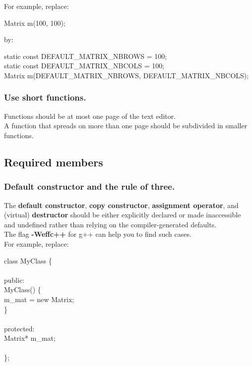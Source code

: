 For example, replace:
\begin{algorithm}[H]
Matrix m(100, 100);
\end{algorithm}

by:
\begin{algorithm}[H]
static const DEFAULT\_MATRIX\_NBROWS = 100; \\
static const DEFAULT\_MATRIX\_NBCOLS = 100; \\
Matrix m(DEFAULT\_MATRIX\_NBROWS, DEFAULT\_MATRIX\_NBCOLS);
\end{algorithm}

\subsubsection{Use short functions.}
Functions should be at most one page of the text editor.\\
A function that spreads on more than one page should be subdivided in
smaller functions.

\subsection{Required members}
\subsubsection{Default constructor and the rule of three.}
The {\bf default constructor}, {\bf copy constructor}, {\bf assignment
  operator}, and (virtual) {\bf destructor} should be either explicitly declared
or made inaccessible and undefined rather than relying on the
compiler-generated defaults.\\
The flag {\bf -Weffc++} for g++ can help you to find such cases.\\

For example, replace:
\begin{algorithm}[H]
class MyClass \{ \\
 \\
public: \\
MyClass() \{ \\
m\_mat = new Matrix; \\
\} \\
 \\
protected: \\
Matrix* m\_mat; \\
 \\
\};
\end{algorithm}

